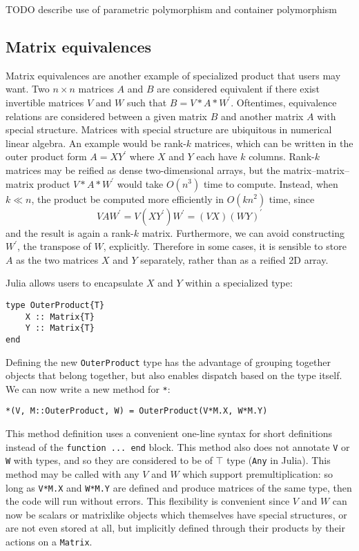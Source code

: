 TODO describe use of parametric polymorphism and container polymorphism

\subsection{Matrix equivalences}

Matrix equivalences are another example of specialized product that users may
want. Two $n\times n$ matrices $A$ and $B$ are considered equivalent if there
exist invertible matrices $V$ and $W$ such that $B = V * A * W^\prime$.
Oftentimes, equivalence relations are considered between a given matrix $B$ and
another matrix $A$ with special structure. Matrices with special structure are
ubiquitous in numerical linear algebra. An example would be rank-$k$ matrices,
which can be written in the outer product form $A = X Y^\prime$ where $X$ and
$Y$ each have $k$ columns. Rank-$k$ matrices may be reified as dense
two-dimensional arrays, but the matrix--matrix--matrix product $V * A *
W^\prime$ would take $O(n^3)$ time to compute. Instead, when $k \ll n$, the
product be computed more efficiently in $O(kn^2)$ time, since
%
\begin{equation}
V A W^\prime = V (X Y^\prime) W^\prime = (V X) (W Y)^\prime
\end{equation}
%
and the result is again a rank-$k$ matrix. Furthermore, we can avoid
constructing $W^\prime$, the transpose of $W$, explicitly. Therefore in some
cases, it is sensible to store $A$ as the two matrices $X$ and $Y$ separately,
rather than as a reified 2D array.

Julia allows users to encapsulate $X$ and $Y$ within a specialized type:
%
\begin{lstlisting}
type OuterProduct{T}
    X :: Matrix{T}
    Y :: Matrix{T}
end
\end{lstlisting}
%
Defining the new \lstinline|OuterProduct| type has the advantage of grouping
together objects that belong together, but also enables dispatch based on the
type itself. We can now write a new method for \lstinline|*|:
%
\begin{lstlisting}
*(V, M::OuterProduct, W) = OuterProduct(V*M.X, W*M.Y)
\end{lstlisting}
%
This method definition uses a convenient one-line syntax for short definitions
instead of the \lstinline|function ... end| block. This method also does not
annotate \lstinline|V| or \lstinline|W| with types, and so they are considered to
be of $\top$ type (\lstinline|Any| in Julia). This method may be called with
any $V$ and $W$ which support premultiplication: so long as \lstinline|V*M.X|
and \lstinline|W*M.Y| are defined and produce matrices of the same type, then
the code will run without errors. This flexibility is convenient since $V$ and
$W$ can now be scalars or matrixlike objects which themselves have special
structures, or are not even stored at all, but implicitly defined through their
products by their actions on a \lstinline|Matrix|.

